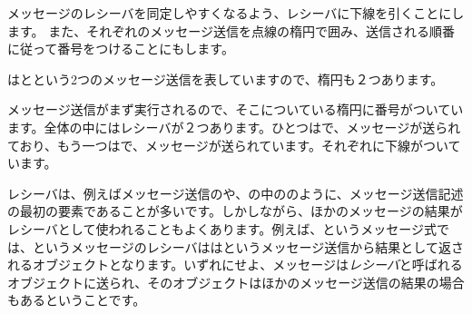 \documentclass[a4paper,10pt,twoside]{book}
\begin{document}


メッセージのレシーバを同定しやすくなるよう、レシーバに下線を引くことにします。
また、それぞれのメッセージ送信を点線の楕円で囲み、送信される順番に従って番号をつけることにもします。


はとという2つのメッセージ送信を表していますので、楕円も２つあります。

メッセージ送信がまず実行されるので、そこについている楕円に番号がついています。全体の中にはレシーバが２つあります。ひとつはで、メッセージが送られており、もう一つはで、メッセージが送られています。それぞれに下線がついています。

レシーバは、例えばメッセージ送信のや、の中ののように、メッセージ送信記述の最初の要素であることが多いです。しかしながら、ほかのメッセージの結果がレシーバとして使われることもよくあります。例えば、というメッセージ式では、というメッセージのレシーバははというメッセージ送信から結果として返されるオブジェクトとなります。いずれにせよ、メッセージは\emph{レシーバ}と呼ばれるオブジェクトに送られ、そのオブジェクトはほかのメッセージ送信の結果の場合もあるということです。
\end{document}
